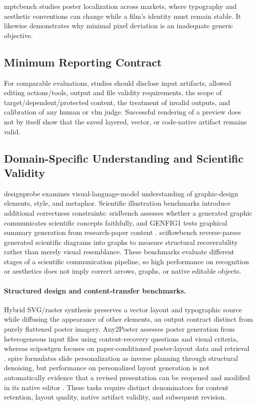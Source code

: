 \ac{mptcbench} studies poster localization across markets, where typography and aesthetic conventions can change while a film's identity must remain stable.
It likewise demonstrates why minimal pixel deviation is an inadequate generic objective.

\subsection{Minimum Reporting Contract}
For comparable evaluations, studies should disclose input artifacts, allowed editing actions/tools, output and file validity requirements, the scope of target/dependent/protected content, the treatment of invalid outputs, and calibration of any human or \ac{vlm} judge.
Successful rendering of a preview does not by itself show that the saved layered, vector, or code-native artifact remains valid.

\subsection{Domain-Specific Understanding and Scientific Validity}
\ac{designprobe} examines visual-language-model understanding of graphic-design elements, style, and metaphor.
Scientific illustration benchmarks introduce additional correctness constraints: \ac{sridbench} assesses whether a generated graphic communicates scientific concepts faithfully, and GENFIG1 tests graphical summary generation from research-paper content \citep{genfig12026}.
\ac{sciflowbench} reverse-parses generated scientific diagrams into graphs to measure structural recoverability rather than merely visual resemblance.
These benchmarks evaluate different stages of a scientific communication pipeline, so high performance on recognition or aesthetics does not imply correct arrows, graphs, or native editable objects.

\paragraph{Structured design and content-transfer benchmarks.}
Hybrid SVG/raster synthesis \citep{gupta2026layercanvas} preserves a vector layout and typographic source while diffusing the appearance of other elements, an output contract distinct from purely flattened poster imagery.
Any2Poster \citep{vinaykumar2026any2poster} assesses poster generation from heterogeneous input files using content-recovery questions and visual criteria, whereas \ac{scipostgen} focuses on paper-conditioned poster-layout data and retrieval \citep{inadumi2025scipostgen}.
\ac{spire} formulates slide personalization as inverse planning through structural denoising, but performance on personalized layout generation is not automatically evidence that a revised presentation can be reopened and modified in its native editor \citep{liu2026spire}.
These tasks require distinct denominators for content retention, layout quality, native artifact validity, and subsequent revision.

